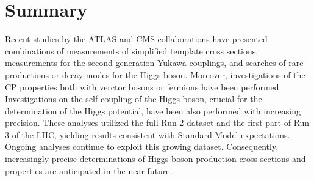 \documentclass[a4paper,11pt]{article}
\begin{document}
\section{Summary}

Recent studies by the ATLAS and CMS collaborations have presented
combinations of measurements of simplified template cross sections,
measurements for the second generation Yukawa couplings, and searches
of rare productions or decay modes for the Higgs boson.  Moreover,
investigations of the CP properties both with verctor bosons or
fermions have been performed. Investigations on the self-coupling of
the Higgs boson, crucial for the determination of the Higgs potential,
have been also performed with increasing precision. These analyses
utilized the full Run 2 dataset and the first part of Run 3 of the
LHC, yielding results consistent with Standard Model expectations.
Ongoing analyses continue to exploit this growing
dataset. Consequently, increasingly precise determinations of Higgs
boson production cross sections and properties are anticipated in the
near future.



\end{document}
